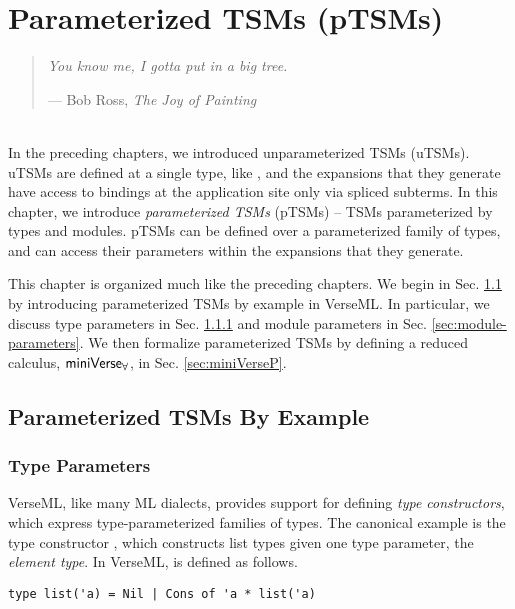 
\chapter{Parameterized TSMs (pTSMs)}\label{chap:ptsms}
\begin{quote}\textit{You know me, I gotta put in a big tree.}
\begin{flushright} --- Bob Ross, \emph{The Joy of Painting}\end{flushright}
\end{quote}
~\\
In the preceding chapters, we introduced unparameterized TSMs (uTSMs). uTSMs are defined at a single type, like , and the expansions that they generate have access to bindings at the application site only via spliced subterms. In this chapter, we introduce \emph{parameterized TSMs} (pTSMs) -- TSMs parameterized by types and modules. pTSMs can be defined over a parameterized family of types, and can access their parameters within the expansions that they generate. 

This chapter is organized much like the preceding chapters. We begin in Sec. \ref{sec:parameterized-tsms-by-example} by introducing parameterized TSMs by example in VerseML. In particular, we discuss type parameters in Sec. \ref{sec:type-parameters} and module parameters in Sec. \ref{sec:module-parameters}. We then formalize parameterized TSMs by defining a reduced calculus, $\mathsf{miniVerse}_\mathbf{\forall}$, in Sec. \ref{sec:miniVerseP}.
\section{Parameterized TSMs By Example}\label{sec:parameterized-tsms-by-example}

\subsection{Type Parameters}\label{sec:type-parameters}
VerseML, like many ML dialects, provides support for defining \emph{type constructors}, which express type-parameterized families of types. The canonical example is the type constructor , which constructs list types given one type parameter, the \emph{element type}. 
In VerseML,  is defined as follows.
\begin{lstlisting}[numbers=none]
type list('a) = Nil | Cons of 'a * list('a)
\end{lstlisting}

